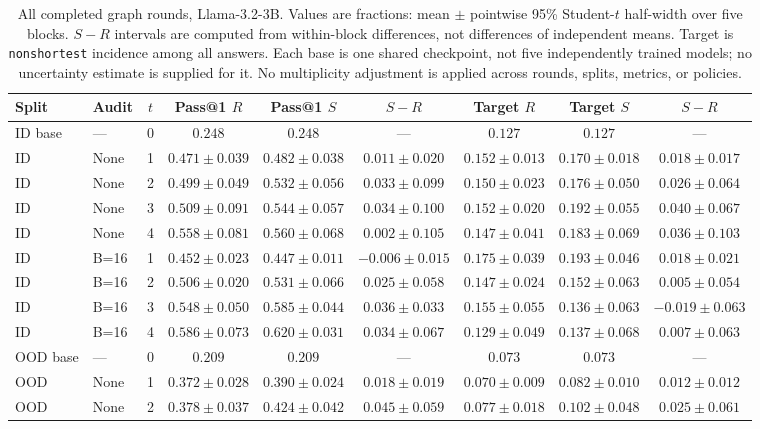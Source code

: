 \begin{table}[H]
\caption{All completed graph rounds, Llama-3.2-3B. Values are fractions: mean $\pm$ pointwise 95\% Student-$t$ half-width over five blocks. $S-R$ intervals are computed from within-block differences, not differences of independent means. Target is \texttt{nonshortest} incidence among all answers. Each base is one shared checkpoint, not five independently trained models; no uncertainty estimate is supplied for it. No multiplicity adjustment is applied across rounds, splits, metrics, or policies.}
\label{tab:h100-rounds}
\centering\footnotesize\setlength{\tabcolsep}{3pt}
\begin{tabular}{@{}llccccccc@{}}
\toprule
Split & Audit & $t$ & Pass@1 $R$ & Pass@1 $S$ & $S-R$ & Target $R$ & Target $S$ & $S-R$\\
\midrule
ID base & --- & 0 & $0.248$ & $0.248$ & --- & $0.127$ & $0.127$ & ---\\
ID & None & 1 & $0.471\pm0.039$ & $0.482\pm0.038$ & $0.011\pm0.020$ & $0.152\pm0.013$ & $0.170\pm0.018$ & $0.018\pm0.017$\\
ID & None & 2 & $0.499\pm0.049$ & $0.532\pm0.056$ & $0.033\pm0.099$ & $0.150\pm0.023$ & $0.176\pm0.050$ & $0.026\pm0.064$\\
ID & None & 3 & $0.509\pm0.091$ & $0.544\pm0.057$ & $0.034\pm0.100$ & $0.152\pm0.020$ & $0.192\pm0.055$ & $0.040\pm0.067$\\
ID & None & 4 & $0.558\pm0.081$ & $0.560\pm0.068$ & $0.002\pm0.105$ & $0.147\pm0.041$ & $0.183\pm0.069$ & $0.036\pm0.103$\\
ID & B=16 & 1 & $0.452\pm0.023$ & $0.447\pm0.011$ & $-0.006\pm0.015$ & $0.175\pm0.039$ & $0.193\pm0.046$ & $0.018\pm0.021$\\
ID & B=16 & 2 & $0.506\pm0.020$ & $0.531\pm0.066$ & $0.025\pm0.058$ & $0.147\pm0.024$ & $0.152\pm0.063$ & $0.005\pm0.054$\\
ID & B=16 & 3 & $0.548\pm0.050$ & $0.585\pm0.044$ & $0.036\pm0.033$ & $0.155\pm0.055$ & $0.136\pm0.063$ & $-0.019\pm0.063$\\
ID & B=16 & 4 & $0.586\pm0.073$ & $0.620\pm0.031$ & $0.034\pm0.067$ & $0.129\pm0.049$ & $0.137\pm0.068$ & $0.007\pm0.063$\\
\midrule
OOD base & --- & 0 & $0.209$ & $0.209$ & --- & $0.073$ & $0.073$ & ---\\
OOD & None & 1 & $0.372\pm0.028$ & $0.390\pm0.024$ & $0.018\pm0.019$ & $0.070\pm0.009$ & $0.082\pm0.010$ & $0.012\pm0.012$\\
OOD & None & 2 & $0.378\pm0.037$ & $0.424\pm0.042$ & $0.045\pm0.059$ & $0.077\pm0.018$ & $0.102\pm0.048$ & $0.025\pm0.061$\\

\end{tabular}
\end{table}

